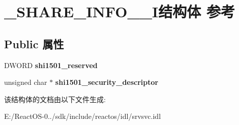 \hypertarget{struct___s_h_a_r_e___i_n_f_o__1501___i}{}\section{\+\_\+\+S\+H\+A\+R\+E\+\_\+\+I\+N\+F\+O\+\_\+\_\+\+I结构体 参考}
\label{struct___s_h_a_r_e___i_n_f_o__1501___i}
\subsection*{Public 属性}
\begin{DoxyCompactItemize}
\item 
\mbox{\label{struct___s_h_a_r_e___i_n_f_o__1501___i_ab863b0d8ad01151043f63d428cc67406}} 
D\+W\+O\+RD {\bfseries shi1501\+\_\+reserved}
\item 
\mbox{\label{struct___s_h_a_r_e___i_n_f_o__1501___i_a23c28922d794578ea115e01d0e6228d5}} 
unsigned char $\ast$ {\bfseries shi1501\+\_\+security\+\_\+descriptor}
\end{DoxyCompactItemize}


该结构体的文档由以下文件生成\+:\begin{DoxyCompactItemize}
\item 
E\+:/\+React\+O\+S-\/0../sdk/include/reactos/idl/srvsvc.\+idl\end{DoxyCompactItemize}
